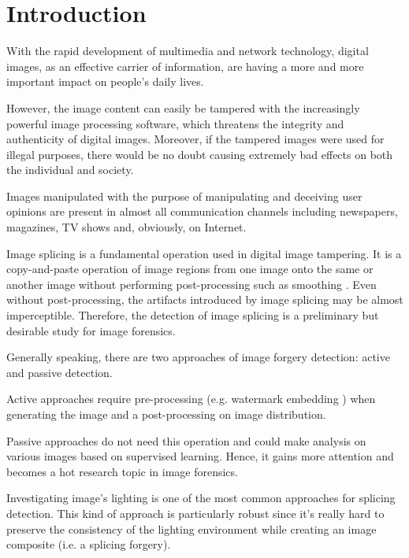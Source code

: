 \chapter*{Introduction}

With the rapid development of multimedia and network technology, digital images, as an effective carrier of information, are having a more and more important impact on people's daily lives. 

However, the image content can easily be tampered with the increasingly powerful image processing software, which threatens the integrity and authenticity of digital images. Moreover, if the tampered images were used for illegal purposes, there would be no doubt causing extremely bad effects on both the individual and society.

Images manipulated with the purpose of manipulating and deceiving user opinions are present in almost all communication channels including newspapers, magazines, TV shows and, obviously, on Internet.\cite{rocha2011vision}

Image splicing is a fundamental operation used in digital image tampering. It is a copy-and-paste
operation of image regions from one image onto the same or another image without performing post-processing such as smoothing \cite{ng2004blind}. Even without post-processing, the artifacts introduced by
image splicing may be almost imperceptible. Therefore, the detection of image splicing is a preliminary but desirable study for image forensics.

Generally speaking, there are two approaches of image forgery detection: active and passive detection. 

Active approaches require pre-processing (e.g. watermark embedding  \cite{rey2002survey}\cite{ye2005watermarking}) when generating the image and a post-processing on image distribution.

Passive approaches \cite{ng2006passive} do not need this operation and could make analysis on various images based on supervised learning. Hence, it gains more attention and becomes
a hot research topic in image forensics.

Investigating image's lighting is one of the most common approaches for splicing detection. This kind of approach is particularly robust since it's really hard to preserve the consistency of the lighting environment while creating an image composite (i.e. a splicing forgery). 

